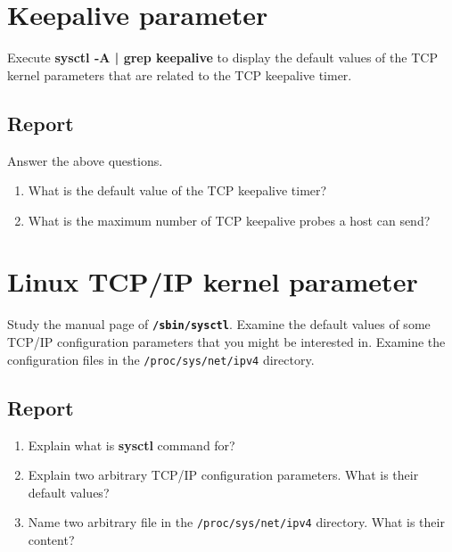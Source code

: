 \documentclass[10pt,a4paper]{article}
\numberwithin{equation}{section}
\numberwithin{figure}{section}
\numberwithin{table}{section}
\begin{document}
\section*{Keepalive parameter}
    Execute \textbf{sysctl -A | grep keepalive} to display the default values of the TCP kernel parameters that are related to the TCP keepalive timer. \\
    \subsection*{Report}
    Answer the above questions.
	\begin{enumerate}
		\item What is the default value of the TCP keepalive timer?
		\item What is the maximum number of TCP keepalive probes a host can send?
    \end{enumerate}

\section*{Linux TCP/IP kernel parameter}
    Study the manual page of \textbf{\texttt{/sbin/sysctl}}.
    Examine the default values of some TCP/IP configuration parameters that you might be interested in.
    Examine the configuration files in the \texttt{/proc/sys/net/ipv4} directory.
    \subsection*{Report}
    \begin{enumerate}
        \item Explain what is \textbf{sysctl} command for?
        \item Explain two arbitrary TCP/IP configuration parameters. What is their default values?
        \item Name two arbitrary file in the \texttt{/proc/sys/net/ipv4} directory. What is their content?
    \end{enumerate}
\end{document}
